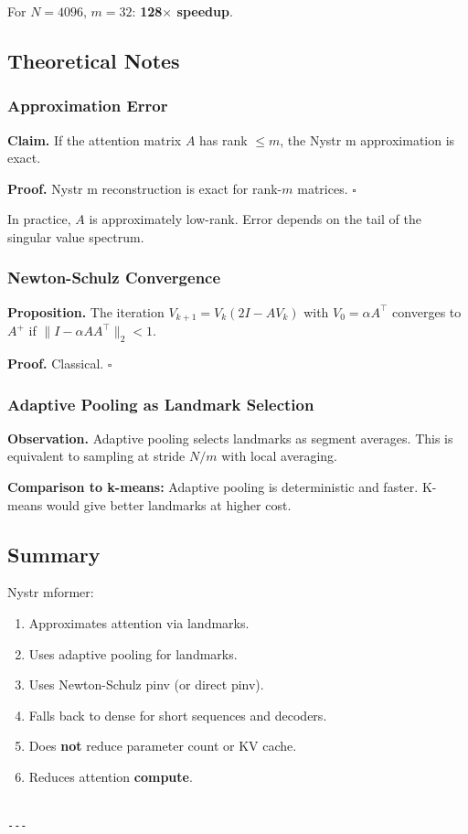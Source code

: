 For $N = 4096$, $m = 32$: \textbf{128$\times$ speedup}.

\subsection{Theoretical Notes}

\subsubsection{Approximation Error}

\textbf{Claim.} If the attention matrix $A$ has rank $\leq m$, the Nystr m 
approximation is exact.

\textbf{Proof.} Nystr m reconstruction is exact for rank-$m$ matrices. $\square$

In practice, $A$ is approximately low-rank. Error depends on the tail of 
the singular value spectrum.

\subsubsection{Newton-Schulz Convergence}

\textbf{Proposition.} The iteration $V_{k+1} = V_k (2I - A V_k)$ with 
$V_0 = \alpha A^\top$ converges to $A^+$ if $\|I - \alpha A A^\top\|_2 < 1$.

\textbf{Proof.} Classical. $\square$

\subsubsection{Adaptive Pooling as Landmark Selection}

\textbf{Observation.} Adaptive pooling selects landmarks as segment averages. 
This is equivalent to sampling at stride $N / m$ with local averaging.

\textbf{Comparison to k-means:} Adaptive pooling is deterministic and faster. 
K-means would give better landmarks at higher cost.

\subsection{Summary}

Nystr mformer:
\begin{enumerate}
\item Approximates attention via landmarks.
\item Uses adaptive pooling for landmarks.
\item Uses Newton-Schulz pinv (or direct pinv).
\item Falls back to dense for short sequences and decoders.
\item Does \textbf{not} reduce parameter count or KV cache.
\item Reduces attention \textbf{compute}.
\end{enumerate}
\begin{lstlisting}

---
\end{lstlisting}